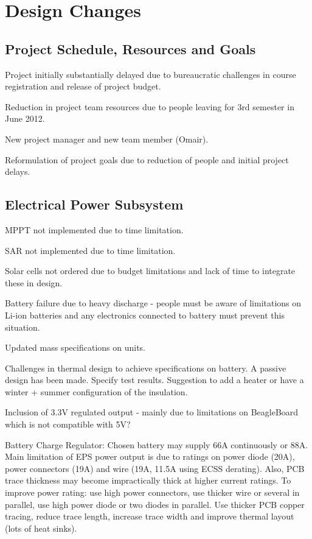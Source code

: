 \newpage
\chapter{Design Changes}
\label{chap:design_changes}


\section{Project Schedule, Resources and Goals}

Project initially substantially delayed due to bureaucratic challenges in course registration and release of project budget.

Reduction in project team resources due to people leaving for 3rd semester in June 2012. 

New project manager and new team member (Omair).

Reformulation of project goals due to reduction of people and initial project delays.



\section{Electrical Power Subsystem}

MPPT not implemented due to time limitation.

SAR not implemented due to time limitation.

Solar cells not ordered due to budget limitations and lack of time to integrate these in design.

Battery failure due to heavy discharge - people must be aware of limitations on Li-ion batteries and any electronics connected to battery must prevent this situation.

Updated mass specifications on units.

Challenges in thermal design to achieve specifications on battery. A passive design has been made. Specify test results. Suggestion to add a heater or have a winter + summer configuration of the insulation.

Inclusion of 3.3V regulated output - mainly due to limitations on BeagleBoard which is not compatible with 5V?

Battery Charge Regulator:
Chosen battery may supply 66A continuously or 88A. Main limitation of EPS power output is due to ratings on power diode (20A), power connectors (19A) and wire (19A, 11.5A using ECSS derating). Also, PCB trace thickness may become impractically thick at higher current ratings. To improve power rating: use high power connectors, use thicker wire or several in parallel, use high power diode or two diodes in parallel. Use thicker PCB copper tracing, reduce trace length, increase trace width and improve thermal layout (lots of heat sinks).

